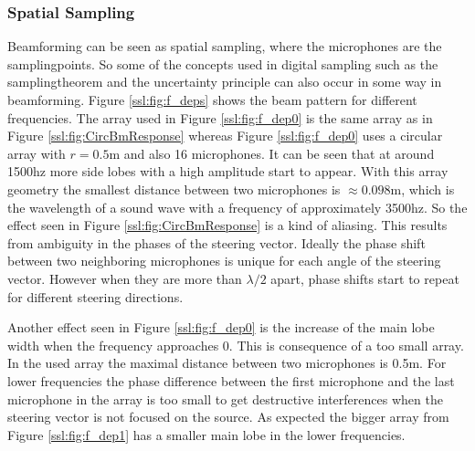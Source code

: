 \subsubsection{Spatial Sampling}
\label{sec:spatSam}
Beamforming can be seen as spatial sampling, where the microphones
are the samplingpoints.
So some of the concepts used in digital sampling such as
the samplingtheorem and the uncertainty principle can also
occur in some way in beamforming.
Figure \ref{ssl:fig:f_deps} shows the beam pattern for different frequencies.
The array used in Figure \ref{ssl:fig:f_dep0} is the same array
as in Figure \ref*{ssl:fig:CircBmResponse} whereas Figure \ref{ssl:fig:f_dep0}
uses a circular array with $r = 0.5$m and also 16 microphones.
It can be seen that at around 1500hz more side lobes with a
high amplitude start to appear.
With this array geometry the smallest distance between two
microphones is $\approx 0.098$m, which is the wavelength
of a sound wave with a frequency of approximately 3500hz.
So the effect seen in Figure \ref*{ssl:fig:CircBmResponse} is
a kind of aliasing.
This results from ambiguity in the phases of the steering vector.
Ideally the phase shift between two neighboring microphones is unique
for each angle of the steering vector.
However when they are more than $\lambda/2$ apart, phase shifts start to
repeat for different steering directions.

Another effect seen in Figure \ref*{ssl:fig:f_dep0} is the increase
of the main lobe width when the frequency approaches 0.
This is consequence of a too small array.
In the used array the maximal distance between two microphones is 0.5m.
For lower frequencies the phase difference between the first microphone and
the last microphone in the array is too small to get destructive
interferences when the steering vector is not focused on the source.
As expected the bigger array from Figure \ref*{ssl:fig:f_dep1} has a smaller
main lobe in the lower frequencies.

